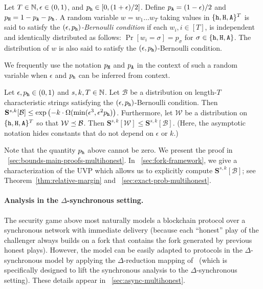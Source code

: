   \begin{definition}\label{def:bernoulli-cond}
    Let $T \in \mathbb{N}, \epsilon \in (0,1)$, and
    $p_{\mathtt{h}} \in [0,(1+\epsilon)/2]$. Define $p_{\mathtt{A}} = (1-\epsilon)/2$ and
    $p_{\mathtt{H}} = 1- p_{\mathtt{A}} - p_{\mathtt{h}}$.  A random variable $w = w_1 \ldots w_T$
    taking values in $\{\mathtt{h}, \mathtt{H}, \mathtt{A}\}^T$ is said to satisfy the
    \emph{$(\epsilon, p_{\mathtt{h}})$-Bernoulli condition} if each
    $w_i, i \in [T]$, is independent and identically distributed as
    follows: $\Pr[w_i = \sigma] = p_\sigma$ for
    $\sigma \in \{\mathtt{h}, \mathtt{H}, \mathtt{A}\}$.  The distribution of $w$ is also said
    to satisfy the $(\epsilon, p_{\mathtt{h}})$-Bernoulli condition.

    We frequently use the notation $p_{\mathtt{H}}$ and $p_{\mathtt{A}}$ in the context of
    such a random variable when $\epsilon$ and $p_{\mathtt{h}}$ can be inferred
    from context.
  \end{definition}
  
  \begin{theorem}\label{thm:main-mh}
    Let $\epsilon, p_{\mathtt{h}} \in (0, 1)$ and $s, k, T \in \mathbb{N}$.  
    Let $\mathcal{B}$ be a distribution 
    on length-$T$ characteristic strings satisfying 
    the $(\epsilon, p_{\mathtt{h}})$-Bernoulli condition.
    Then 
    $
      \mathbf{S}^{s,k}[\mathcal{B}] 
        \leq 
        \exp\left(-k\cdot \Omega( 
          \min(\epsilon^3, \epsilon^2 p_{\mathtt{h}}) 
        \right)
    $.
    Furthermore, 
    let 
    $\mathcal{W}$ be a distribution on
    $\{\mathtt{h}, \mathtt{H}, \mathtt{A}\}^T$ so that 
    $\mathcal{W} \preceq \mathcal{B}$. 
    Then $\mathbf{S}^{s,k}[\mathcal{W}] 
        \leq \mathbf{S}^{s,k}[\mathcal{B}]$.   
    (Here, the asymptotic notation hides constants that do not depend on $\epsilon$ or $k$.)
  \end{theorem}
  Note that the quantity $p_{\mathtt{h}}$ above cannot be zero.
  We present the proof in \Section~\ref{sec:bounds-main-proofs-multihonest}. 
  In \Section~\ref{sec:fork-framework}, 
  we give a characterization of the UVP which 
  allows us to explicitly compute $\mathbf{S}^{s,k}[\mathcal{B}]$; 
  see 
  Theorem~\ref{thm:relative-margin} and 
  \Section~\ref{sec:exact-prob-multihonest}.


  \paragraph{Analysis in the $\Delta$-synchronous setting.} The security
   game above most naturally models a blockchain protocol over a
   synchronous network with immediate delivery (because each ``honest''
   play of the challenger always builds on a fork that contains the fork
   generated by previous honest plays). However, the model can be easily
   adapted to protocols in the $\Delta$-synchronous model by applying
   the $\Delta$-reduction mapping of~\cite{Praos} (which is specifically
   designed to lift the synchronous analysis to the $\Delta$-synchronous
   setting).
   These details appear in \Section~\ref{sec:async-multihonest}.



